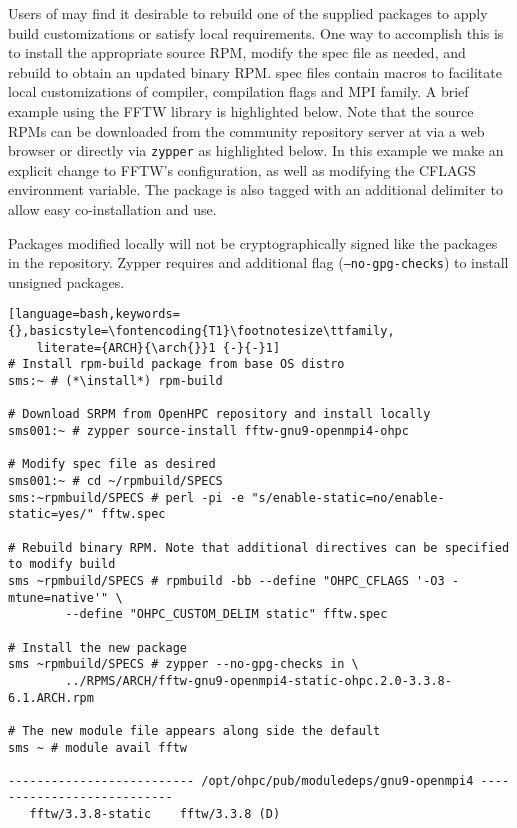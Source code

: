 Users of \OHPC{} may find it desirable to rebuild one of the supplied packages
to apply build customizations or satisfy local requirements. One way to
accomplish this is to install the appropriate source RPM, modify the spec file
as needed, and rebuild to obtain an updated binary RPM. \OHPC{} spec files
contain macros to facilitate local customizations of compiler, compilation
flags and MPI family. A brief example using
the FFTW library is highlighted below.  Note that the source RPMs can be downloaded from the
community repository server at \href{http://repos.openhpc.community}
{\color{blue}{http://repos.openhpc.community}} via a web browser or directly
via \texttt{zypper} as highlighted below. In this example we make an explicit
change to FFTW's configuration, as well as modifying the CFLAGS environment
variable. The package is also tagged with an additional delimiter to allow easy
co-installation and use. 

\begin{center}
\begin{tcolorbox}[]
\small
Packages modified locally will not be cryptographically signed like the packages
    in the \OHPC{} repository. Zypper requires and additional flag
    (\texttt{--no-gpg-checks}) to install unsigned packages.
\end{tcolorbox}
\end{center}

\begin{lstlisting}[language=bash,keywords={},basicstyle=\fontencoding{T1}\footnotesize\ttfamily,
    literate={ARCH}{\arch{}}1 {-}{-}1]
# Install rpm-build package from base OS distro
sms:~ # (*\install*) rpm-build

# Download SRPM from OpenHPC repository and install locally
sms001:~ # zypper source-install fftw-gnu9-openmpi4-ohpc

# Modify spec file as desired
sms001:~ # cd ~/rpmbuild/SPECS
sms:~rpmbuild/SPECS # perl -pi -e "s/enable-static=no/enable-static=yes/" fftw.spec

# Rebuild binary RPM. Note that additional directives can be specified to modify build
sms ~rpmbuild/SPECS # rpmbuild -bb --define "OHPC_CFLAGS '-O3 -mtune=native'" \
        --define "OHPC_CUSTOM_DELIM static" fftw.spec

# Install the new package
sms ~rpmbuild/SPECS # zypper --no-gpg-checks in \
        ../RPMS/ARCH/fftw-gnu9-openmpi4-static-ohpc.2.0-3.3.8-6.1.ARCH.rpm

# The new module file appears along side the default
sms ~ # module avail fftw

-------------------------- /opt/ohpc/pub/moduledeps/gnu9-openmpi4 ---------------------------
   fftw/3.3.8-static    fftw/3.3.8 (D)
\end{lstlisting}
